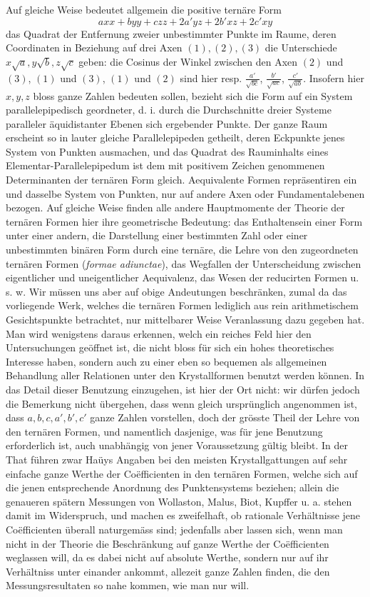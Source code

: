 \documentclass[12pt]{article}
\begin{document}
Auf gleiche Weise bedeutet allgemein die positive ternäre Form
\[
axx+byy+czz+2a'yz+2b'xz+2c'xy
\]
das Quadrat der Entfernung zweier unbestimmter Punkte im Raume, deren Coordinaten in Beziehung auf drei Axen $(1),(2),(3)$ die Unterschiede $x\sqrt a,y\sqrt b,z\sqrt c$ geben: die Cosinus der Winkel zwischen den Axen $(2)$ und $(3)$, $(1)$ und $(3)$, $(1)$ und $(2)$ sind hier resp. $\frac{a'}{\sqrt{bc}}$, $\frac{b'}{\sqrt{ac}}$, $\frac{c'}{\sqrt{ab}}$. Insofern hier $x,y,z$ bloss ganze Zahlen bedeuten sollen, bezieht sich die Form auf ein System parallelepipedisch geordneter, d. i. durch die Durchschnitte dreier Systeme paralleler äquidistanter Ebenen sich ergebender Punkte. Der ganze Raum erscheint so in lauter gleiche Parallelepipeden getheilt, deren Eckpunkte jenes System von Punkten ausmachen, und das Quadrat des Rauminhalts eines Elementar-Parallelepipedum ist dem mit positivem Zeichen genommenen Determinanten der ternären Form gleich. Aequivalente Formen repräsentiren ein und dasselbe System von Punkten, nur auf andere Axen oder Fundamentalebenen bezogen. Auf gleiche Weise finden alle andere Hauptmomente der Theorie der ternären Formen hier ihre geometrische Bedeutung: das Enthaltensein einer Form unter einer andern, die Darstellung einer bestimmten Zahl oder einer unbestimmten binären Form durch eine ternäre, die Lehre von den zugeordneten ternären Formen (\textit{formae adiunctae}), das Wegfallen der Unterscheidung zwischen eigentlicher und uneigentlicher Aequivalenz, das Wesen der reducirten Formen u. s. w. Wir müssen uns aber auf obige Andeutungen beschränken, zumal da das vorliegende Werk, welches die ternären Formen lediglich aus rein arithmetischem Gesichtspunkte betrachtet, nur mittelbarer Weise Veranlassung dazu gegeben hat. Man wird wenigstens daraus erkennen, welch ein reiches Feld hier den Untersuchungen geöffnet ist, die nicht bloss für sich ein hohes theoretisches Interesse haben, sondern auch zu einer eben so bequemen als allgemeinen Behandlung aller Relationen unter den Krystallformen benutzt werden können. In das Detail dieser Benutzung einzugehen, ist hier der Ort nicht: wir dürfen jedoch die Bemerkung nicht übergehen, dass wenn gleich ursprünglich angenommen ist, dass $a,b,c,a',b',c'$ ganze Zahlen vorstellen, doch der grösste Theil der Lehre von den ternären Formen, und namentlich dasjenige, was für jene Benutzung erforderlich ist, auch unabhängig von jener Voraussetzung gültig bleibt. In der That führen zwar Haüys Angaben bei den meisten Krystallgattungen auf sehr einfache ganze Werthe der Coëfficienten in den ternären Formen, welche sich auf die jenen entsprechende Anordnung des Punktensystems beziehen; allein die genaueren spätern Messungen von Wollaston, Malus, Biot, Kupffer u. a. stehen damit im Widerspruch, und machen es zweifelhaft, ob rationale Verhältnisse jene Coëfficienten überall naturgemäss sind; jedenfalls aber lassen sich, wenn man nicht in der Theorie die Beschränkung auf ganze Werthe der Coëfficienten weglassen will, da es dabei nicht auf absolute Werthe, sondern nur auf ihr Verhältniss unter einander ankommt, allezeit ganze Zahlen finden, die den Messungsresultaten so nahe kommen, wie man nur will.
\end{document}
